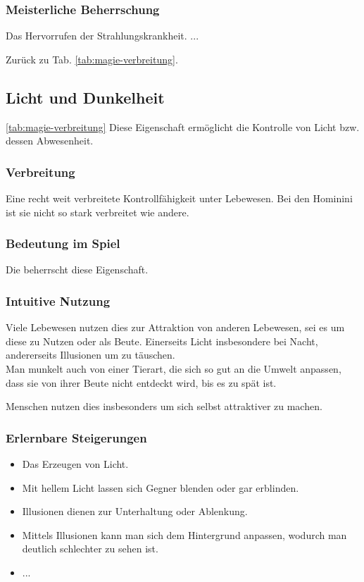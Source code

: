 \subsubsection{Meisterliche Beherrschung} 
\begin{outline}
	\1 Das Hervorrufen der Strahlungskrankheit.
	\1 ...
\end{outline}
Zurück zu Tab. \ref{tab:magie-verbreitung}.



\subsection{Licht und Dunkelheit} \label{sec:lichtmagie} \ref{tab:magie-verbreitung}
Diese Eigenschaft ermöglicht die Kontrolle von Licht bzw. dessen Abwesenheit.

\subsubsection{Verbreitung}
Eine recht weit verbreitete Kontrollfähigkeit unter Lebewesen. Bei den Hominini ist sie nicht so stark verbreitet wie andere.

\subsubsection{Bedeutung im Spiel}
Die  beherrscht diese Eigenschaft. 


\subsubsection{Intuitive Nutzung}
Viele Lebewesen nutzen dies zur Attraktion von anderen Lebewesen, sei es um diese zu Nutzen oder als Beute. Einerseits Licht insbesondere bei Nacht, andererseits Illusionen um zu täuschen. \\
Man munkelt auch von einer Tierart, die sich so gut an die Umwelt anpassen, dass sie von ihrer Beute nicht entdeckt wird, bis es zu spät ist. 

Menschen nutzen dies insbesonders um sich selbst attraktiver zu machen.

\subsubsection{Erlernbare Steigerungen}
\begin{itemize}
	\item Das Erzeugen von Licht.
	\item Mit hellem Licht lassen sich Gegner blenden oder gar erblinden.
	\item Illusionen dienen zur Unterhaltung oder Ablenkung.
	\item Mittels Illusionen kann man sich dem Hintergrund anpassen, wodurch man deutlich schlechter zu sehen ist.
	\item ...
\end{itemize}

